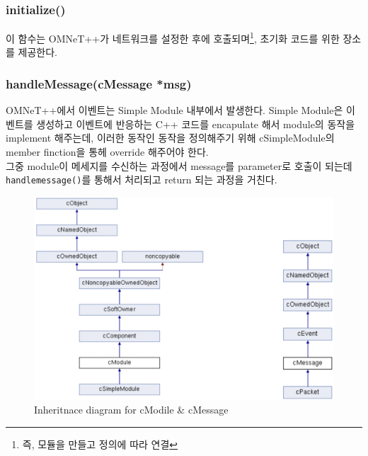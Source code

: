     \subsubsection*{initialize()}
    이 함수는 OMNeT++가 네트워크를 설정한 후에 호출되며\footnote{즉, 모듈을 만들고 정의에 따라 연결}, 초기화 코드를 위한 장소를 제공한다.
\vspace{-2mm}
    \subsubsection*{handleMessage(cMessage *msg)}
    OMNeT++에서 이벤트는 Simple Module 내부에서 발생한다. Simple Module은 이벤트를 생성하고 이벤트에 반응하는 C++ 코드를 encapulate 해서 module의 동작을 implement 해주는데, 이러한 동작인 동작을 정의해주기 위해 cSimpleModule의 member finction을 통헤 override 해주어야 한다.\\
    그중 module이 메세지를 수신하는 과정에서 message를 parameter로 호출이 되는데 \texttt{handlemessage()}를 통해서 처리되고 return 되는 과정을 거친다.\\
\vspace{-4mm}  
    \begin{figure}[!h]\centering
		\includegraphics[width=.7\textwidth]{image/week10/23.png}
		\caption*{\small Inheritnace diagram for cModile \& cMessage}
		\vspace{-10pt}
    \end{figure}
\vspace{-4mm}